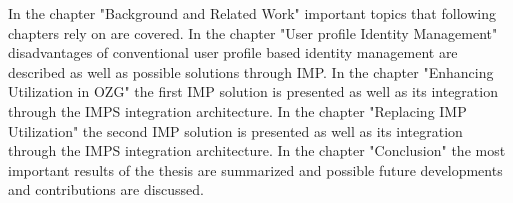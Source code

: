In the chapter "Background and Related Work" important topics that following chapters rely on are covered.
In the chapter "User profile Identity Management" disadvantages of conventional user profile based identity management are described as well as possible solutions through IMP.
In the chapter "Enhancing Utilization in OZG" the first IMP solution is presented as well as its integration through the IMPS integration architecture.
In the chapter "Replacing IMP Utilization" the second IMP solution is presented as well as its integration through the IMPS integration architecture.
In the chapter "Conclusion" the most important results of the thesis are summarized and possible future developments and contributions are discussed.